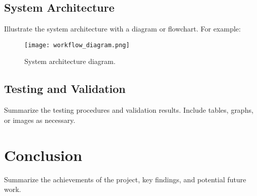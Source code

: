 \documentclass[12pt,a4paper]{article}
\begin{document}
\subsection{System Architecture}\label{subsec:systemarchitecture}
Illustrate the system architecture with a diagram or flowchart. For example:
\begin{figure}[h!]
    \centering
    \texttt{[image: workflow\_diagram.png]} %
    \caption{System architecture diagram.}
    \label{fig:workflow_diagram}
\end{figure}


\subsection{Testing and Validation}\label{subsec:testing}
Summarize the testing procedures and validation results. Include tables, graphs, or images as necessary.

\section{Conclusion}\label{sec:conclusion}
Summarize the achievements of the project, key findings, and potential future work. 
\end{document}
